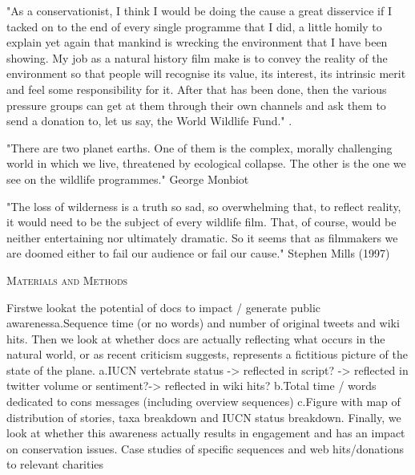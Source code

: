 \documentclass[12pt,letterpaper]{article}
\renewcommand{\section}[1]{%
\bigskip
\begin{center}
\begin{Large}
\normalfont\scshape #1
\medskip
\end{Large}
\end{center}}
\begin{document}
"As a conservationist, I think I would be doing the cause a great disservice if I tacked on to the end of every single programme that I did, a little homily to explain yet again that mankind is wrecking the environment that I have been showing. My job as a natural history film make is to convey the reality of the environment so that people will recognise its value, its interest, its intrinsic merit and feel some responsibility for it. After that has been done, then the various pressure groups can get at them through their own channels and ask them to send a donation to, let us say, the World Wildlife Fund." \cite{burgess1984exploring}.

"There are two planet earths. One of them is the complex, morally challenging world in which we live, threatened by ecological collapse. The other is the one we see on the wildlife programmes." George Monbiot

"The loss of wilderness is a truth so sad, so overwhelming that, to reflect reality, it would need to be the subject of every wildlife film. That, of course, would be neither entertaining nor ultimately dramatic. So it seems that as filmmakers we are doomed either to fail our audience or fail our cause."
Stephen Mills (1997)


%
%
\section{Materials and Methods}
Firstwe lookat the potential of docs to impact / generate public awarenessa.Sequence time (or no words) and number of original tweets and wiki hits. Then we look at whether docs are actually reflecting what occurs in the natural world, or as recent criticism suggests, represents a fictitious picture of the state of the plane. a.IUCN vertebrate status -> reflected in script? -> reflected in twitter volume or sentiment?-> reflected in wiki hits? b.Total time / words dedicated to cons messages (including overview sequences) c.Figure with map of distribution of stories, taxa breakdown and IUCN status breakdown. Finally, we look at whether this awareness actually results in engagement and has an impact on conservation issues. Case studies of specific sequences and web hits/donations to relevant charities

%
%
\end{document}
